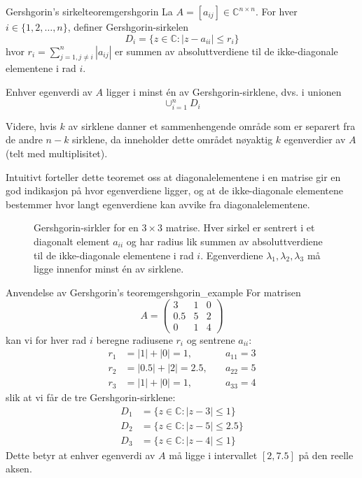 \begin{theorem}{Gershgorin's sirkelteorem}{gershgorin}
	La $A = [a_{ij}] \in \mathbb{C}^{n \times n}$. For hver $i \in \{1,2,\ldots,n\}$, definer Gershgorin-sirkelen
	\[
		D_i = \{z \in \mathbb{C} : |z - a_{ii}| \leq r_i\}
	\]
	hvor $r_i = \sum_{j=1,j\neq i}^{n} |a_{ij}|$ er summen av absoluttverdiene til de ikke-diagonale elementene i rad $i$.

	Enhver egenverdi av $A$ ligger i minst én av Gershgorin-sirklene, dvs. i unionen
	\[
		\cup_{i=1}^{n} D_i
	\]

	Videre, hvis $k$ av sirklene danner et sammenhengende område som er separert fra de andre $n-k$ sirklene, da inneholder dette området nøyaktig $k$ egenverdier av $A$ (telt med multiplisitet).
\end{theorem}

Intuitivt forteller dette teoremet oss at diagonalelementene i en matrise gir en god indikasjon på hvor egenverdiene ligger, og at de ikke-diagonale elementene bestemmer hvor langt egenverdiene kan avvike fra diagonalelementene.

\begin{figure}
	\centering
	
	\caption{Gershgorin-sirkler for en $3 \times 3$ matrise. Hver sirkel er sentrert i et diagonalt element $a_{ii}$ og har radius lik summen av absoluttverdiene til de ikke-diagonale elementene i rad $i$. Egenverdiene $\lambda_1, \lambda_2, \lambda_3$ må ligge innenfor minst én av sirklene.}
	\label{fig:gershgorin}
\end{figure}

\begin{example}{Anvendelse av Gershgorin's teorem}{gershgorin_example}
	For matrisen
	\[
		A = \begin{pmatrix} 3 & 1 & 0 \\ 0.5 & 5 & 2 \\ 0 & 1 & 4 \end{pmatrix}
	\]
	kan vi for hver rad $i$ beregne radiusene $r_i$ og sentrene $a_{ii}$:
	\begin{align*}
		r_1 & = |1| + |0| = 1,     & \quad a_{11} = 3 \\
		r_2 & = |0.5| + |2| = 2.5, & \quad a_{22} = 5 \\
		r_3 & = |1| + |0| = 1,     & \quad a_{33} = 4
	\end{align*}
	slik at vi får de tre Gershgorin-sirklene:
	\begin{align*}
		D_1 & = \{z \in \mathbb{C} : |z - 3| \leq 1\}   \\
		D_2 & = \{z \in \mathbb{C} : |z - 5| \leq 2.5\} \\
		D_3 & = \{z \in \mathbb{C} : |z - 4| \leq 1\}
	\end{align*}
	Dette betyr at enhver egenverdi av $A$ må ligge i intervallet $[2,7.5]$ på den reelle aksen.
\end{example}


